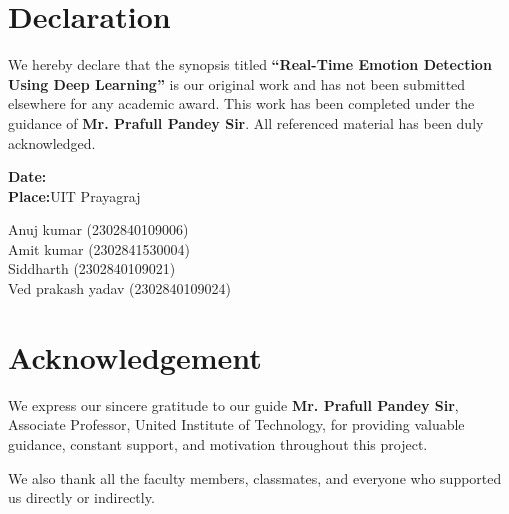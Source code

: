 \documentclass[12pt,a4paper]{report}
\begin{document}

\chapter*{\centering\textbf{Declaration}}
\vspace{1.0cm}

We hereby declare that the synopsis titled  
\textbf{“Real-Time Emotion Detection Using Deep Learning”}  
is our original work and has not been submitted elsewhere for any academic award.  
This work has been completed under the guidance of  
\textbf{Mr. Prafull Pandey Sir}.  
All referenced material has been duly acknowledged.

\vspace{1.2cm}

\noindent\textbf{Date:}\\
\noindent\textbf{Place:}\hspace{1cm}UIT Prayagraj

\vspace{1cm}
\begin{flushright}
Anuj kumar (2302840109006)\\
Amit kumar (2302841530004)\\
Siddharth (2302840109021)\\
Ved prakash yadav (2302840109024)

\end{flushright}

\clearpage


\chapter*{\centering\textbf{Acknowledgement}}
\vspace{1.0cm}

We express our sincere gratitude to our guide  
\textbf{Mr. Prafull Pandey Sir},  
Associate Professor, United Institute of Technology,  
for providing valuable guidance, constant support, and motivation throughout this project.

We also thank all the faculty members, classmates, and everyone who supported us directly or indirectly.
\end{document}
